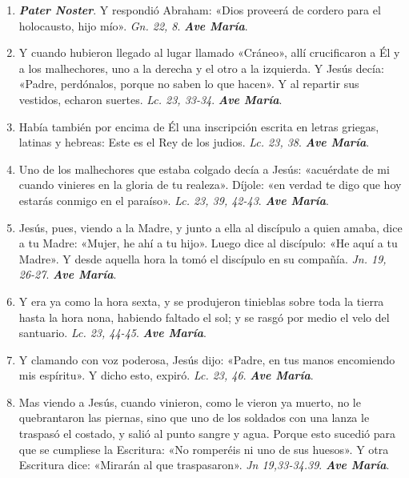 \documentclass[../../devocionario.tex]{subfiles}
\begin{document}
    \begin{enumerate}
    
        \item \textbf{\textit{Pater Noster}}. Y respondió Abraham: «Dios proveerá de cordero para el holocausto, hijo mío». 
            \textit{Gn. 22, 8}. \textbf{\textit{Ave María}}.

        \item Y cuando hubieron llegado al lugar llamado «Cráneo», allí crucificaron a Él y a los malhechores, 
            uno a la derecha y el otro a la izquierda. Y Jesús decía: «Padre, perdónalos, porque no saben lo que hacen». 
            Y al repartir sus vestidos, echaron suertes. \textit{Lc. 23, 33-34}. \textbf{\textit{Ave María}}.

        \item Había también por encima de Él una inscripción escrita en letras griegas, latinas y hebreas: 
            Este es el Rey de los judios. \textit{Lc. 23, 38}. \textbf{\textit{Ave María}}.

        \item Uno de los malhechores que estaba colgado decía a Jesús: «acuérdate de mi cuando vinieres en la gloria de tu realeza». 
            Díjole: «en verdad te digo que hoy estarás conmigo en el paraíso». \textit{Lc. 23, 39, 42-43}. \textbf{\textit{Ave María}}.

        \item Jesús, pues, viendo a la Madre, y junto a ella al discípulo a quien amaba, dice a tu Madre: 
            «Mujer, he ahí a tu hijo». Luego dice al discípulo: «He aquí a tu Madre». 
            Y desde aquella hora la tomó el discípulo en su compañía. \textit{Jn. 19, 26-27}. \textbf{\textit{Ave María}}.

        \item Y era ya como la hora sexta, y se produjeron tinieblas sobre toda la tierra hasta la hora nona, 
            habiendo faltado el sol; y se rasgó por medio el velo del santuario. \textit{Lc. 23, 44-45}. \textbf{\textit{Ave María}}.

        \item Y clamando con voz poderosa, Jesús dijo: «Padre, en tus manos encomiendo mis espíritu». Y dicho esto, expiró. 
            \textit{Lc. 23, 46}. \textbf{\textit{Ave María}}.

        \item Mas viendo a Jesús, cuando vinieron, como le vieron ya muerto, no le quebrantaron las piernas, sino que uno de los soldados 
            con una lanza le traspasó el costado, y salió al punto sangre y agua. Porque esto sucedió para que se  cumpliese
            la Escritura: «No romperéis ni uno de sus huesos». Y otra Escritura dice: «Mirarán al que traspasaron».
             \textit{Jn 19,33-34.39}. \textbf{\textit{Ave María}}.


\end{enumerate}
\end{document}
